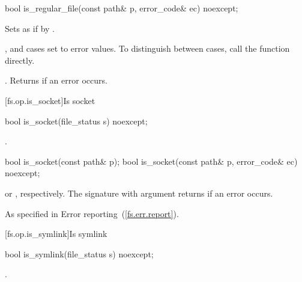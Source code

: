 %
\begin{itemdecl}
bool is_regular_file(const path& p, error_code& ec) noexcept;
\end{itemdecl}

\begin{itemdescr}
\pnum
\effects Sets  as if by . \begin{note}
,  and
   cases set  to error values. To distinguish between cases, call the  function directly. \end{note}

\pnum
\returns {}.
Returns  if an error occurs.
\end{itemdescr}


[fs.op.is_socket]{Is socket}

%
\begin{itemdecl}
bool is_socket(file_status s) noexcept;
\end{itemdecl}

\begin{itemdescr}
\pnum
\returns {}.
\end{itemdescr}

%
\begin{itemdecl}
bool is_socket(const path& p);
bool is_socket(const path& p, error_code& ec) noexcept;
\end{itemdecl}

\begin{itemdescr}
\pnum
\returns {} or
  , respectively. The signature with argument
   returns  if an error occurs.

\pnum
\throws As specified in Error reporting~(\ref{fs.err.report}).
\end{itemdescr}


[fs.op.is_symlink]{Is symlink}

%
\begin{itemdecl}
bool is_symlink(file_status s) noexcept;
\end{itemdecl}

\begin{itemdescr}
\pnum
\returns {}.
\end{itemdescr}

